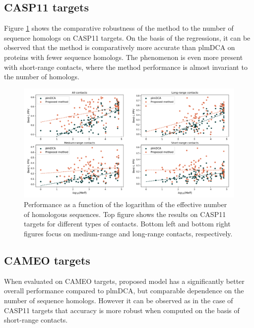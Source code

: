     \subsection{CASP11 targets}

    Figure \ref{sensitivity} shows the comparative robustness
    of the method to the number of sequence homologs
    on CASP11 targets. On the basis of the regressions, it can be observed that
    the method is comparatively more accurate than plmDCA on proteins with
    fewer sequence homologs. The phenomenon is even more present with short-range contacts,
    where the method performance is almost invariant to the number of homologs.

    \begin{figure}[H]
        \begin{center}
            \includegraphics[width=\textwidth, keepaspectratio]{imgs/Meff.png}
            \caption{Performance as a function of the logarithm of the effective
            number of homologous sequences. Top figure shows the results on
            CASP11 targets for different types of contacts. Bottom left and bottom right figures
            focus on medium-range and long-range contacts, respectively.}
            \label{sensitivity}
        \end{center}
    \end{figure}

    \subsection{CAMEO targets}

    When evaluated on CAMEO targets, proposed model has a significantly better overall performance
    compared to plmDCA, but comparable dependence on the number of sequence homologs.
    However it can be observed as in the case of CASP11 targets that accuracy is more robust
    when computed on the basis of short-range contacts.

